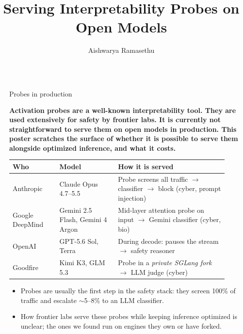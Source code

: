 \documentclass[final]{beamer}
\title{Serving Interpretability Probes on Open Models}
\author{Aishwarya Ramasethu}
\institute[shortinst]{Prediction Guard}
\newlength{\sepwidth}
\newlength{\colwidth}
\newcommand{\separatorcolumn}{\begin{column}{\sepwidth}\end{column}}
\begin{document}
\begin{frame}[t]
\begin{columns}[t]
\separatorcolumn

\begin{column}{\colwidth}

    \begin{block}{Probes in production}

    \textbf{Activation probes are a well-known interpretability tool. They are used extensively for safety by frontier labs. It is currently not straightforward to serve them on open models in production. This poster scratches the surface of whether it is possible to serve them alongside optimized inference, and what it costs.}

    \begin{table}
      \centering
      \begin{tabular}{@{}p{0.2\linewidth} p{0.25\linewidth} p{0.47\linewidth}@{}}
        \toprule
        \textbf{Who} & \textbf{Model} & \textbf{How it is served} \\
        \midrule
        Anthropic & Claude Opus 4.7--5.5 & Probe screens all traffic $\rightarrow$ classifier $\rightarrow$ block (cyber, prompt injection) \\
        Google DeepMind & Gemini 2.5 Flash, Gemini 4 Argon & Mid-layer attention probe on input $\rightarrow$ Gemini classifier (cyber, bio) \\
        OpenAI & GPT-5.6 Sol, Terra & During decode: pauses the stream $\rightarrow$ safety reasoner \\
        Goodfire & Kimi K3, GLM 5.3 & Probe in a \emph{private SGLang fork} $\rightarrow$ LLM judge (cyber) \\
        \bottomrule
      \end{tabular}
    \end{table}

    \begin{itemize}
      \item Probes are usually the first step in the safety stack: they screen 100\% of traffic and escalate ${\sim}$5--8\% to an LLM classifier.
      \item How frontier labs serve these probes while keeping inference optimized is unclear; the ones we found run on engines they own or have forked.
    \end{itemize}


\end{block}
\end{column}
\end{columns}
\end{frame}
\end{document}
